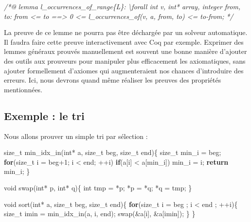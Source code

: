 \documentclass[12pt,francais,]{scrbook}
\newenvironment{Shaded}{}{}
\newcommand{\KeywordTok}[1]{\textcolor[rgb]{0.00,0.44,0.13}{\textbf{{#1}}}}
\newcommand{\DataTypeTok}[1]{\textcolor[rgb]{0.56,0.13,0.00}{{#1}}}
\newcommand{\DecValTok}[1]{\textcolor[rgb]{0.25,0.63,0.44}{{#1}}}
\newcommand{\CommentTok}[1]{\textcolor[rgb]{0.38,0.63,0.69}{\textit{{#1}}}}
\newcommand{\NormalTok}[1]{{#1}}
\begin{document}
\begin{footnotesize}\begin{Shaded}
\begin{Highlighting}[]
\CommentTok{/*@}
\CommentTok{lemma l_occurrences_of_range\{L\}:}
\CommentTok{  \textbackslash{}forall int v, int* array, integer from, to:}
\CommentTok{    from <= to ==> 0 <= l_occurrences_of(v, a, from, to) <= to-from;}
\CommentTok{*/}
\end{Highlighting}
\end{Shaded}\end{footnotesize}

La preuve de ce lemme ne pourra pas être déchargée par un solveur
automatique. Il faudra faire cette preuve interactivement avec Coq par
exemple. Exprimer des lemmes généraux prouvés manuellement est souvent
une bonne manière d'ajouter des outils aux prouveurs pour manipuler plus
efficacement les axiomatiques, sans ajouter formellement d'axiomes qui
augmenteraient nos chances d'introduire des erreurs. Ici, nous devrons
quand même réaliser les preuves des propriétés mentionnées.

\subsection{Exemple : le tri}\label{exemple-le-tri}

Nous allons prouver un simple tri par sélection :

\begin{footnotesize}\begin{Shaded}
\begin{Highlighting}[]
\NormalTok{size_t min_idx_in(}\DataTypeTok{int}\NormalTok{* a, size_t beg, size_t end)\{}
  \NormalTok{size_t min_i = beg;}
  \KeywordTok{for}\NormalTok{(size_t i = beg}\DecValTok{+1}\NormalTok{; i < end; ++i)}
    \KeywordTok{if}\NormalTok{(a[i] < a[min_i]) min_i = i;}
  \KeywordTok{return} \NormalTok{min_i;}
\NormalTok{\}}

\DataTypeTok{void} \NormalTok{swap(}\DataTypeTok{int}\NormalTok{* p, }\DataTypeTok{int}\NormalTok{* q)\{}
  \DataTypeTok{int} \NormalTok{tmp = *p; *p = *q; *q = tmp;}
\NormalTok{\}}

\DataTypeTok{void} \NormalTok{sort(}\DataTypeTok{int}\NormalTok{* a, size_t beg, size_t end)\{}
  \KeywordTok{for}\NormalTok{(size_t i = beg ; i < end ; ++i)\{}
    \NormalTok{size_t imin = min_idx_in(a, i, end);}
    \NormalTok{swap(&a[i], &a[imin]);}
  \NormalTok{\}}
\NormalTok{\}}
\end{Highlighting}
\end{Shaded}\end{footnotesize}
\end{document}
